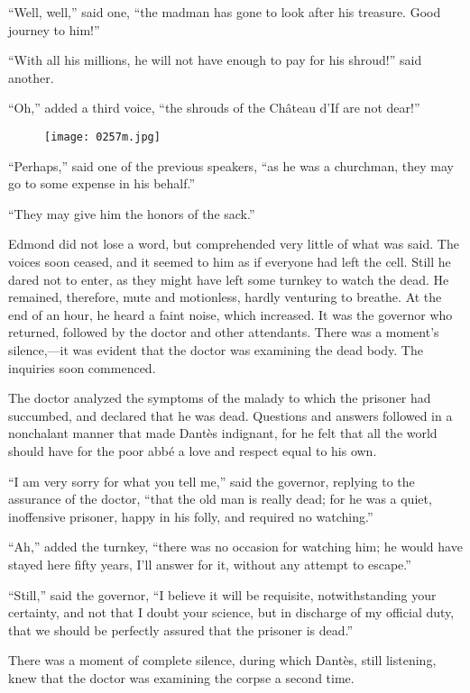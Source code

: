 “Well, well,” said one, “the madman has gone to look after his
treasure. Good journey to him!”

“With all his millions, he will not have enough to pay for his shroud!”
said another.

“Oh,” added a third voice, “the shrouds of the Château d’If are not
dear!”

\begin{figure}[ht]
\texttt{[image: 0257m.jpg]}
\end{figure}

“Perhaps,” said one of the previous speakers, “as he was a churchman,
they may go to some expense in his behalf.”

“They may give him the honors of the sack.”

Edmond did not lose a word, but comprehended very little of what was
said. The voices soon ceased, and it seemed to him as if everyone had
left the cell. Still he dared not to enter, as they might have left
some turnkey to watch the dead. He remained, therefore, mute and
motionless, hardly venturing to breathe. At the end of an hour, he
heard a faint noise, which increased. It was the governor who returned,
followed by the doctor and other attendants. There was a moment’s
silence,—it was evident that the doctor was examining the dead body.
The inquiries soon commenced.

The doctor analyzed the symptoms of the malady to which the prisoner
had succumbed, and declared that he was dead. Questions and answers
followed in a nonchalant manner that made Dantès indignant, for he felt
that all the world should have for the poor abbé a love and respect
equal to his own.

“I am very sorry for what you tell me,” said the governor, replying to
the assurance of the doctor, “that the old man is really dead; for he
was a quiet, inoffensive prisoner, happy in his folly, and required no
watching.”

“Ah,” added the turnkey, “there was no occasion for watching him; he
would have stayed here fifty years, I’ll answer for it, without any
attempt to escape.”

“Still,” said the governor, “I believe it will be requisite,
notwithstanding your certainty, and not that I doubt your science, but
in discharge of my official duty, that we should be perfectly assured
that the prisoner is dead.”

There was a moment of complete silence, during which Dantès, still
listening, knew that the doctor was examining the corpse a second time.

